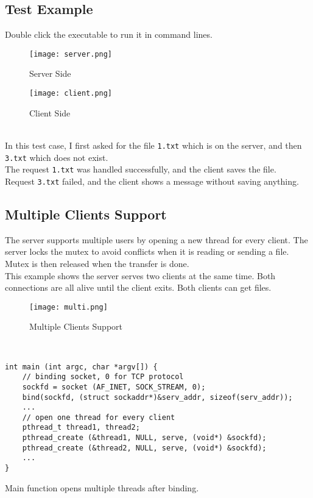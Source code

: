 \documentclass[a4paper, 11pt]{article}
\begin{document}
\subsection*{Test Example}
Double click the executable to run it in command lines. 
\begin{figure}[hbp]
\begin{minipage}[t]{0.5\linewidth}
\centering
\texttt{[image: server.png]}
\caption{Server Side}
\end{minipage}%
\begin{minipage}[t]{0.5\linewidth}
\centering
\texttt{[image: client.png]}
\caption{Client Side}
\end{minipage}
\end{figure}\\
In this test case, I first asked for the file \texttt{1.txt} which is on the server, and then \texttt{3.txt} which does not exist. \\
The request \texttt{1.txt} was handled successfully, and the client saves the file. \\
Request \texttt{3.txt} failed, and the client shows a message without saving anything.

\subsection*{Multiple Clients Support}
The server supports multiple users by opening a new thread for every client. The server locks the mutex to avoid conflicts when it is reading or sending a file. Mutex is then released when the transfer is done.\\
This example shows the server serves two clients at the same time. Both connections are all alive until the client exits. Both clients can get files.
\begin{figure}[hbp]
\centering
\texttt{[image: multi.png]}
\caption{Multiple Clients Support}
\end{figure}
~\\
\lstset{
  basicstyle=\ttfamily,
}
{
\begin{lstlisting}
int main (int argc, char *argv[]) {
    // binding socket, 0 for TCP protocol
    sockfd = socket (AF_INET, SOCK_STREAM, 0);
    bind(sockfd, (struct sockaddr*)&serv_addr, sizeof(serv_addr));
    ...
    // open one thread for every client
    pthread_t thread1, thread2;
    pthread_create (&thread1, NULL, serve, (void*) &sockfd);
    pthread_create (&thread2, NULL, serve, (void*) &sockfd);
    ...
}
\end{lstlisting}}
\begin{center}
Main function opens multiple threads after binding.
\end{center}
\end{document}
